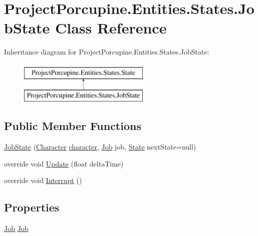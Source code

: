 \hypertarget{class_project_porcupine_1_1_entities_1_1_states_1_1_job_state}{}\section{Project\+Porcupine.\+Entities.\+States.\+Job\+State Class Reference}
\label{class_project_porcupine_1_1_entities_1_1_states_1_1_job_state}
Inheritance diagram for Project\+Porcupine.\+Entities.\+States.\+Job\+State\+:\begin{figure}[H]
\begin{center}
\leavevmode
\includegraphics[height=2.000000cm]{class_project_porcupine_1_1_entities_1_1_states_1_1_job_state}
\end{center}
\end{figure}
\subsection*{Public Member Functions}
\begin{DoxyCompactItemize}
\item 
\hyperlink{class_project_porcupine_1_1_entities_1_1_states_1_1_job_state_a1dc9321876f623b68a250b384637cfd4}{Job\+State} (\hyperlink{class_project_porcupine_1_1_entities_1_1_character}{Character} \hyperlink{class_project_porcupine_1_1_entities_1_1_states_1_1_state_a0647dd5dacc8fba22b1c462c954180c7}{character}, \hyperlink{class_job}{Job} job, \hyperlink{class_project_porcupine_1_1_entities_1_1_states_1_1_state}{State} next\+State=null)
\item 
override void \hyperlink{class_project_porcupine_1_1_entities_1_1_states_1_1_job_state_a78be509101aa1172cdac8b0dd90b8412}{Update} (float delta\+Time)
\item 
override void \hyperlink{class_project_porcupine_1_1_entities_1_1_states_1_1_job_state_a538f6ddf6987df25b399324840ae3354}{Interrupt} ()
\end{DoxyCompactItemize}
\subsection*{Properties}
\begin{DoxyCompactItemize}
\item 
\hyperlink{class_job}{Job} \hyperlink{class_project_porcupine_1_1_entities_1_1_states_1_1_job_state_a44e8a9a507572f451211d6dda14d7289}{Job}
\end{DoxyCompactItemize}

